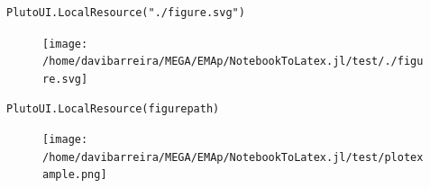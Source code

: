 \begin{lstlisting}[language=JuliaLocal, style=julia]
PlutoUI.LocalResource("./figure.svg")
\end{lstlisting}

\begin{figure}[H]
	\centering
	\texttt{[image: /home/davibarreira/MEGA/EMAp/NotebookToLatex.jl/test/./figure.svg]}
	\label{fig:/home/davibarreira/MEGA/EMAp/NotebookToLatex.jl/test/./figure.svg}

\end{figure}

\begin{lstlisting}[language=JuliaLocal, style=julia]
PlutoUI.LocalResource(figurepath)
\end{lstlisting}

\begin{figure}[H]
	\centering
	\texttt{[image: /home/davibarreira/MEGA/EMAp/NotebookToLatex.jl/test/plotexample.png]}
	\label{fig:/home/davibarreira/MEGA/EMAp/NotebookToLatex.jl/test/plotexample.png}

\end{figure}

